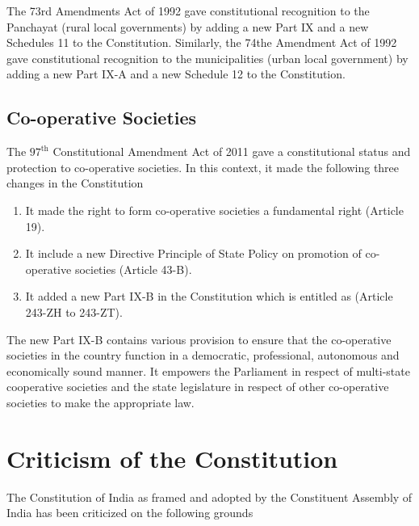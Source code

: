 The 73rd Amendments Act of 1992 gave constitutional recognition to the Panchayat (rural local governments) by adding a new Part IX and a new Schedules 11 to the Constitution. Similarly, the 74the Amendment Act of 1992 gave constitutional recognition to the municipalities (urban local government) by adding a new Part IX-A and a new Schedule 12 to the Constitution.

\subsection{Co-operative Societies}

The $97^{\text{th}}$ Constitutional Amendment Act of 2011 gave a constitutional status and protection to co-operative societies. In this context, it made the following three changes in the Constitution

\begin{enumerate}
  \item It made the right to form co-operative societies a fundamental right (Article 19).
  \item It include a new Directive Principle of State Policy on promotion of co-operative societies (Article 43-B).
  \item It added a new Part IX-B in the Constitution which is entitled as  (Article 243-ZH to 243-ZT).
\end{enumerate}

The new Part IX-B contains various provision to ensure that the co-operative societies in the country function in a democratic, professional, autonomous and economically sound manner. It empowers the Parliament in respect of multi-state cooperative societies and the state legislature in respect of other co-operative societies to make the appropriate law.

\section{Criticism of the Constitution}

The Constitution of India as framed and adopted by the Constituent Assembly of India has been criticized on the following grounds

